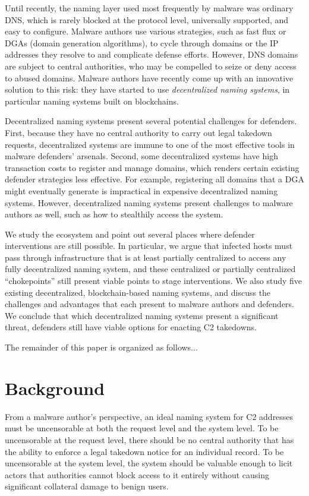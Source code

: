 \documentclass[10pt,sigconf,letterpaper]{acmart}
\begin{document}
Until recently, the naming layer used most frequently by malware was ordinary DNS, which is rarely 
blocked at the protocol level, universally supported, and easy to configure. Malware authors use 
various strategies, such as fast flux or DGAs (domain generation algorithms), to cycle through domains 
or the IP addresses they resolve to and complicate defense efforts. However, DNS domains are subject 
to central authorities, who may be compelled to seize or deny access to abused domains. Malware 
authors have recently come up with an innovative solution to this risk: they have started to use 
\emph{decentralized naming systems}, in particular naming systems built on blockchains. 

Decentralized naming systems present several potential challenges for defenders. First, because they 
have no central authority to carry out legal takedown requests, decentralized systems are immune to 
one of the most effective tools in malware defenders' arsenals. Second, some decentralized systems 
have high transaction costs to register and manage domains, which renders certain existing defender 
strategies less effective. For example, registering all domains that a DGA might eventually generate 
is impractical in expensive decentralized naming systems. However, decentralized naming systems 
present challenges to malware authors as well, such as how to stealthily access the system.

We study the ecosystem and point out several places where defender interventions are still possible. 
In particular, we argue that infected hosts must pass through infrastructure that is at least 
partially centralized to access any fully decentralized naming system, and these centralized or 
partially centralized ``chokepoints'' still present viable points to stage interventions. We also 
study five existing decentralized, blockchain-based naming systems, and discuss the challenges and 
advantages that each present to malware authors and defenders. We conclude that which decentralized 
naming systems present a significant threat, defenders still have viable options for enacting C2 
takedowns.

The remainder of this paper is organized as follows...

\section{Background}

From a malware author's perspective, an ideal naming system for C2 
addresses must be uncensorable at both the request level and the system level. To be 
uncensorable at the request level, there should be no central authority that 
has the ability to enforce a legal takedown notice for an individual record. To 
be uncensorable at the system level, the system should be valuable enough to 
licit actors that authorities cannot block access to it entirely without 
causing significant collateral damage to benign users.
\end{document}
